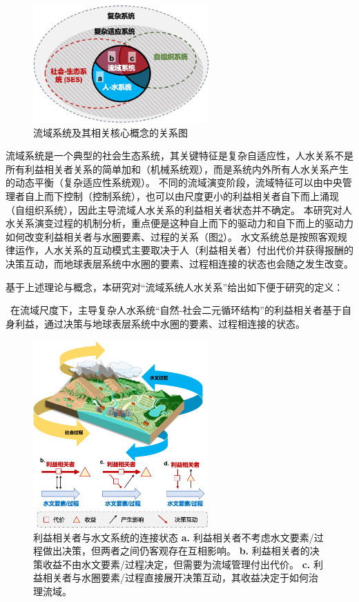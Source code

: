 \begin{figure}[!ht] %
    \centering
    \includegraphics[width=0.6\textwidth]{img/ch2/ch2_concepts.png}
    \caption{流域系统及其相关核心概念的关系图}\label{ch2:fig:concepts}
\end{figure}

流域系统是一个典型的社会\textendash{}生态系统，其关键特征是复杂自适应性，人\textendash{}水关系不是所有利益相关者关系的简单加和（机械系统观），而是系统内外所有人\textendash{}水关系产生的动态平衡（复杂适应性系统观）。
不同的流域演变阶段，流域特征可以由中央管理者自上而下控制（控制系统），也可以由尺度更小的利益相关者自下而上涌现（自组织系统），因此主导流域人\textendash{}水关系的利益相关者状态并不确定。
本研究对人\textendash{}水关系演变过程的机制分析，重点便是这种自上而下的驱动力和自下而上的驱动力如何改变利益相关者与水圈要素、过程的关系（图\ref{ch2:fig:interactions}）。
水文系统总是按照客观规律运作，人\textendash{}水关系的互动模式主要取决于人（利益相关者）付出代价并获得报酬的决策互动，而地球表层系统中水圈的要素、过程相连接的状态也会随之发生改变。

基于上述理论与概念，本研究对“流域系统人\textendash{}水关系”给出如下便于研究的定义：

{\kai~在流域尺度下，主导复杂人水系统“自然-社会二元循环结构”的利益相关者基于自身利益，通过决策与地球表层系统中水圈的要素、过程相连接的状态。}

\begin{figure}[!ht]
    \centering
    \includegraphics[width=0.6\textwidth]{img/ch2/ch2_interactions.png}
    \caption[利益相关者与水文系统的连接状态]{利益相关者与水文系统的连接状态
        \textbf{a.} 利益相关者不考虑水文要素/过程做出决策，但两者之间仍客观存在互相影响。
        \textbf{b.} 利益相关者的决策收益不由水文要素/过程决定，但需要为流域管理付出代价。
        \textbf{c.} 利益相关者与水圈要素/过程直接展开决策互动，其收益决定于如何治理流域。
    }\label{ch2:fig:interactions}
\end{figure}
